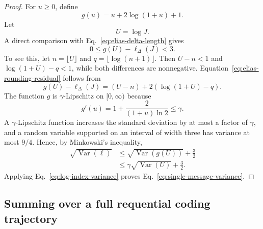 \documentclass{article}
\theoremstyle{plain}
\theoremstyle{definition}
\theoremstyle{remark}
\begin{document}
\begin{proof}
For $u\geq0$, define
\begin{equation}
    g(u)
    =
    u+2\log(1+u)+1.
\end{equation}
Let
\begin{equation}
    U
    =
    \log J.
\end{equation}
A direct comparison with Eq.~\eqref{eq:elias-delta-length} gives
\begin{equation}
    0
    \leq
    g(U)-\ell_\Delta(J)
    <3.
    \label{eq:elias-rounding-residual}
\end{equation}
To see this, let $n=\lfloor U\rfloor$ and $q=\lfloor\log(n+1)\rfloor$. Then $U-n<1$ and $\log(1+U)-q<1$, while both differences are nonnegative. Equation~\eqref{eq:elias-rounding-residual} follows from
\begin{equation}
    g(U)-\ell_\Delta(J)
    =
    (U-n)
    +2\left(\log(1+U)-q\right).
\end{equation}
The function $g$ is $\gamma$-Lipschitz on $[0,\infty)$ because
\begin{equation}
    g'(u)
    =
    1+\frac{2}{(1+u)\ln 2}
    \leq
    \gamma.
\end{equation}
A $\gamma$-Lipschitz function increases the standard deviation by at most a factor of $\gamma$, and a random variable supported on an interval of width three has variance at most $9/4$. Hence, by Minkowski's inequality,
\begin{align}
    \sqrt{\operatorname{Var}(\ell)}
    &\leq
    \sqrt{\operatorname{Var}(g(U))}
    +\frac{3}{2}
    \\
    &\leq
    \gamma\sqrt{\operatorname{Var}(U)}
    +\frac{3}{2}.
\end{align}
Applying Eq.~\eqref{eq:log-index-variance} proves Eq.~\eqref{eq:single-message-variance}.
\end{proof}

\subsection{Summing over a full requential coding trajectory}
\end{document}
